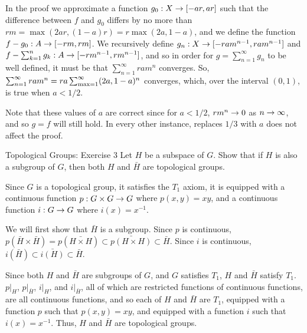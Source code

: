 \documentclass{hmwk}
\begin{document}
\begin{solution}
    
\pre In the proof we approximate a function $g_0: X \rightarrow [-ar, ar]$ such that the difference between $f$ and $g_0$ differs by no more than $rm = \max(2ar, (1-a)r) = r\max(2a, 1-a)$, and we define the function $f - g_0: A \rightarrow [-rm, rm]$. We recursively define $g_n: X \rightarrow [-ram^{n-1}, ram^{n-1}]$ and $f - \sum_{k=1}^n g_k: A \rightarrow [-rm^{n-1}, rm^{n-1}]$, and so in order for $g = \sum_{n=1}^\infty g_n$ to be well defined, it must be that $\sum_{n=1}^\infty ram^n$ converges. So, $\sum_{n=1}^\infty ram^n = ra\sum_{\max=1}^\infty(2a, 1-a)^n$ converges, which, over the interval $(0, 1)$, is true when $a < 1/2$. 

\pre Note that these values of $a$ are correct since for $a < 1/2$, $rm^n \rightarrow 0$ as $n \rightarrow \infty$, and so $g = f$ will still hold. In every other instance, replaces $1/3$ with $a$ does not affect the proof. 
\end{solution}

\begin{problem}{Topological Groups: Exercise 3}
    Let $H$ be a subspace of $G$. Show that if $H$ is also a subgroup of $G$, then both $H$ and $\bar{H}$ are topological groups. 
\end{problem}

\begin{solution}

\pre Since $G$ is a topological group, it satisfies the $T_1$ axiom, it is equipped with a continuous function $p: G \times G \rightarrow G$ where $p(x, y) = xy$, and a continuous function $i: G \rightarrow G$ where $i(x) = x^{-1}$.

\pre We will first show that $\bar{H}$ is a subgroup. Since $p$ is continuous, $p(\bar{H} \times \bar{H}) = p(\bar{H \times H}) \subset \bar{p(H \times H)} \subset \bar{H}$. Since $i$ is continuous, $i(\bar{H}) \subset \bar{i(H)} \subset \bar{H}$. 

\pre Since both $H$ and $\bar{H}$ are subgroups of $G$, and $G$ satisfies $T_1$, $H$ and $\bar{H}$ satisfy $T_1$. $p|_H$, $p|_{\bar{H}}$, $i|_H$, and $i|_{\bar{H}}$, all of which are restricted functions of continuous functions, are all continuous functions, and so each of $H$ and $\bar{H}$ are $T_1$, equipped with a function $p$ such that $p(x, y) = xy$, and equipped with a function $i$ such that $i(x) = x^{-1}$. Thus, $H$ and $\bar{H}$ are topological groups. 
\end{solution}
\end{document}
